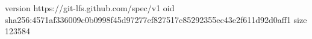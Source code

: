 version https://git-lfs.github.com/spec/v1
oid sha256:4571af336009c0b0998f45d97277ef827517c85292355ec43e2f611d92d0aff1
size 123584

